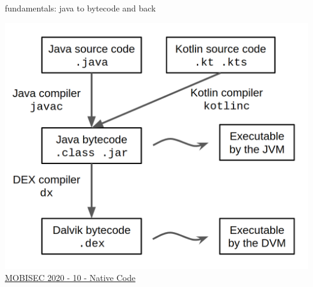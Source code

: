 \documentclass{beamer}
\begin{document}
\begin{frame}{fundamentals: java to bytecode and back}

    \centering \includegraphics[scale=0.2]{java-to-dex.png}\\
    \href{https://docs.google.com/presentation/d/14nid9QJrSRUd4T_48KZMhWqKT_UdLg7EM-RH0HFQYdM}{MOBISEC 2020 - 10 - Native Code}

\end{frame}






    
\end{document}
